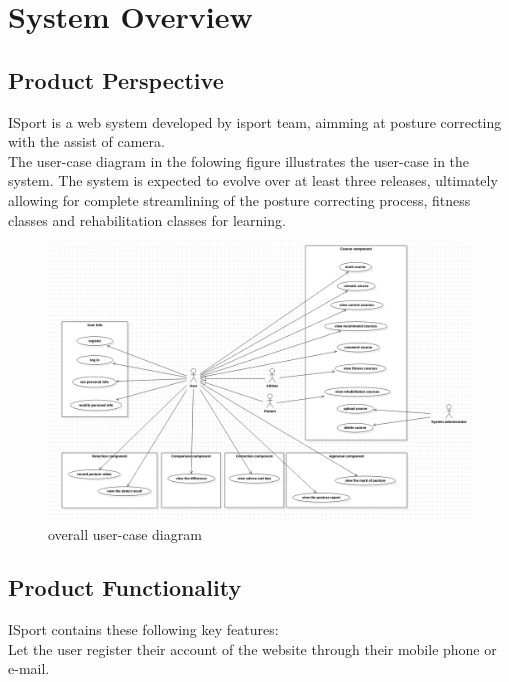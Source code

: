 \documentclass[16pt]{scrreprt}
\begin{document}

\chapter{System Overview}
\section{Product Perspective}

ISport is a web system developed by isport team, aimming at posture correcting with the assist of camera.\\

The user-case diagram in the folowing figure illustrates the user-case in the system. The system is expected to evolve over at least three releases, ultimately allowing for complete streamlining of the posture correcting process, fitness classes and rehabilitation classes for learning.

\begin{figure}[H]
    \centering
    \includegraphics[width=1.0\textwidth]{diagrams/big-user-case.png}
    \caption{overall user-case diagram}
\end{figure}



\section{Product Functionality}

ISport contains these following key features:\\

Let the user register their account of the website through their mobile phone or e-mail.\\
\end{document}
